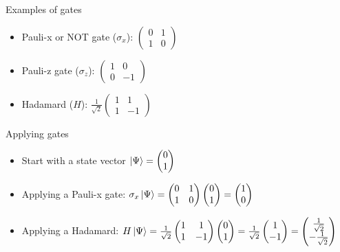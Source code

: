 \documentclass[14pt]{beamer}
\begin{document}
\begin{frame}{Examples of gates}
\begin{itemize}
	\item Pauli-x or NOT gate ($\sigma_x$): $\begin{pmatrix} 0 & 1 \\ 1 & 0 \end{pmatrix}$
	\item Pauli-z gate ($\sigma_z$): $\begin{pmatrix} 1 & 0 \\ 0 & -1 \end{pmatrix}$
	\item Hadamard ($H$): $\frac{1}{\sqrt{2}}\begin{pmatrix} 1 & 1 \\ 1 & -1 \end{pmatrix}$
\end{itemize}
\end{frame}

\begin{frame}{Applying gates}
\begin{itemize}
	\item Start with a state vector $\ket{\Psi} = \begin{pmatrix}0 \\ 1\end{pmatrix}$
	\item Applying a Pauli-x gate: $\sigma_x \ket{\Psi} = \begin{pmatrix} 0 & 1 \\ 1 & 0 \end{pmatrix}\begin{pmatrix}0 \\ 1\end{pmatrix} = \begin{pmatrix}1 \\ 0\end{pmatrix}$
	\item Applying a Hadamard: $H \ket{\Psi} = \frac{1}{\sqrt{2}}\begin{pmatrix} 1 & 1 \\ 1 & -1 \end{pmatrix}\begin{pmatrix}0 \\ 1\end{pmatrix} = \frac{1}{\sqrt{2}}\begin{pmatrix}1 \\ -1\end{pmatrix} = \begin{pmatrix}\frac{1}{\sqrt{2}} \\ -\frac{1}{\sqrt{2}}\end{pmatrix}$
	
\end{itemize}
\end{frame}
\end{document}
